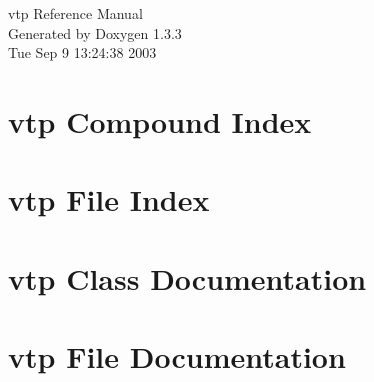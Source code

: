 \documentclass[a4paper]{book}
\begin{document}
\begin{titlepage}
\vspace*{7cm}
\begin{center}
{\Large vtp Reference Manual}\\
\vspace*{1cm}
{\large Generated by Doxygen 1.3.3}\\
\vspace*{0.5cm}
{\small Tue Sep 9 13:24:38 2003}\\
\end{center}
\end{titlepage}
\clearemptydoublepage
{}
\tableofcontents
\clearemptydoublepage
{}
\chapter{vtp Compound Index}

\chapter{vtp File Index}

\chapter{vtp Class Documentation}

















\chapter{vtp File Documentation}






















\printindex
\end{document}
